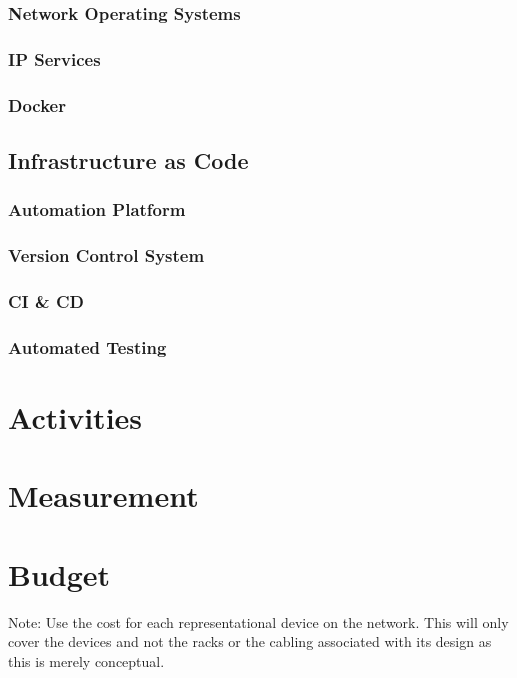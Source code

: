 \documentclass[12pt, letterpaper]{article}
\begin{document}
		\subsubsection{Network Operating Systems}
		\subsubsection{IP Services}
		\subsubsection{Docker}
		
	\subsection{Infrastructure as Code}
		\subsubsection{Automation Platform}
		\subsubsection{Version Control System}
		\subsubsection{CI \& CD}
		\subsubsection{Automated Testing}
		

\newpage

\section{Activities}

\newpage

\section{Measurement}

\newpage

\section{Budget}
Note: Use the cost for each representational device on the network.
This will only cover the devices and not the racks or the cabling associated with its design as this is merely conceptual.
\end{document}
